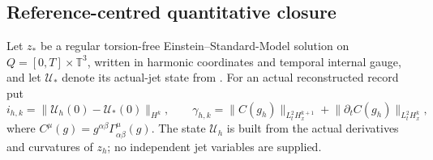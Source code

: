 \documentclass[11pt]{article}
\numberwithin{equation}{section}
\theoremstyle{definition}
\theoremstyle{remark}
\newcommand{\norm}[1]{\lVert#1\rVert}
\begin{document}
\subsection{Reference-centred quantitative closure}

Let $z_*$ be a regular torsion-free Einstein--Standard-Model solution on $Q=[0,T]\times\mathbb T^3$, written in harmonic coordinates and temporal internal gauge, and let $\mathcal U_*$ denote its actual-jet state from .  For an actual reconstructed record put
\begin{equation}
 i_{h,k}=\norm{\mathcal U_h(0)-\mathcal U_*(0)}_{H^k},
 \qquad
 \gamma_{h,k}=\norm{C(g_h)}_{L^2_tH_x^{k+1}}
              +\norm{\partial_tC(g_h)}_{L^2_tH_x^k},
 \label{eq:native-initial-gauge}
\end{equation}
where $C^\mu(g)=g^{\alpha\beta}\Gamma^\mu_{\alpha\beta}(g)$.  The state $\mathcal U_h$ is built from the actual derivatives and curvatures of $z_h$; no independent jet variables are supplied.
\end{document}
